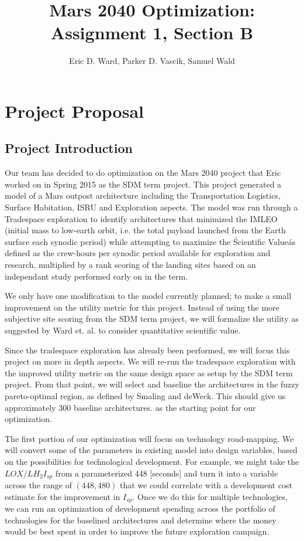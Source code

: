 \documentclass[11pt]{article} %
\title{Mars 2040 Optimization: Assignment 1, Section B}
\author{Eric D. Ward, Parker D. Vascik, Samuel Wald}
\begin{document}
\maketitle
\section{Project Proposal}
\subsection{Project Introduction}
Our team has decided to do optimization on the Mars 2040 project that Eric worked on in Spring 2015 as the SDM term project.  This project generated a model of a Mars outpost architecture including the Transportation Logistics, Surface Habitation, ISRU and Exploration aspects.  The model was run through a Tradespace exploration to identify architectures that minimized the IMLEO (initial mass to low-earth orbit, i.e. the total payload launched from the Earth surface each synodic period) while attempting to maximize the \'Scientific Value\' as defined as the crew-hours per synodic period available for exploration and research, multiplied by a rank scoring of the landing sites based on an independant study performed early on in the term.

We only have one modification to the model currently planned; to make a small improvement on the utility metric for this project.  Instead of using the more subjective site scoring from the SDM term project, we will formalize the utility as suggested by Ward et. al.\cite{util} to consider quantitative scientific value.

Since the tradespace exploration has already been performed, we will focus this project on more in depth aspects. We will re-run the tradespace exploration with the improved utility metric on the same design space as setup by the SDM term project. From that point, we will select and baseline the architectures in the fuzzy pareto-optimal region, as defined by Smaling and deWeck\cite{fuzzy}.  This should give us approximately 300 baseline architectures. as the starting point for our optimization.

The first portion of our optimization will focus on technology road-mapping.  We will convert some of the parameters in existing model into design variables, based on the possibilities for technological development. For example, we might take the $LOX/LH_2 I_{sp}$ from a parameterized 448 [seconds] and turn it into a variable across the range of $(448,480)$ that we could correlate with a development cost estimate for the improvement in $I_{sp}$.  Once we do this for multiple technologies, we can run an optimization of development spending across the portfolio of technologies for the baselined architectures and determine where the money would be best spent in order to improve the future exploration campaign.
\end{document}
